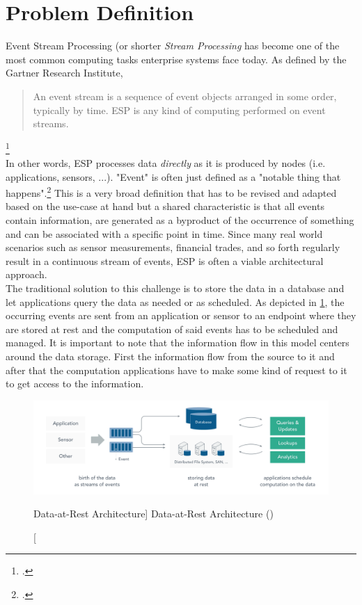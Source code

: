 \section{Problem Definition}

Event Stream Processing (or shorter \textit{Stream Processing} has become one of the most common computing tasks enterprise systems face today. As defined by the Gartner Research Institute,
\blockquote{An event stream is a sequence of event objects arranged in some order, typically by time. \acf{ESP} is any kind of computing performed on event streams.}\footcite{Schulte2017TechnologyProcessing}\\
In other words, \acf{ESP} processes data \textit{directly} as it is produced by nodes (i.e. applications, sensors, ...). "Event" is often just defined as a "notable thing that happens".\footcite{Michelson2011ElementalOverview} This is a very broad definition that has to be revised and adapted based on the use-case at hand but a shared characteristic is that all events contain information, are generated as a byproduct of the occurrence of something and can be associated with a specific point in time. 
Since many real world scenarios such as sensor measurements, financial trades, and so forth regularly result in a continuous stream of events, \acf{ESP} is often a viable architectural approach.\\
The traditional solution to this challenge is to store the data in a database and let applications query the data as needed or as scheduled. As depicted in \ref{fig:dataRest}, the occurring events are sent from an application or sensor to an endpoint where they are stored at rest and the computation of said events has to be scheduled and managed. It is important to note that the information flow in this model centers around the data storage. First the information flow from the source to it and after that the computation applications have to make some kind of request to it to get access to the information.

\begin{figure}[ht]
    \includegraphics[width=\linewidth]{images/streaming/data_at_rest.png}\centering
    \caption
    [Data-at-Rest Architecture]
    {Data-at-Rest Architecture (\cite{dataArtisansWhatProcessing})}
    \label{fig:dataRest}
\end{figure}

